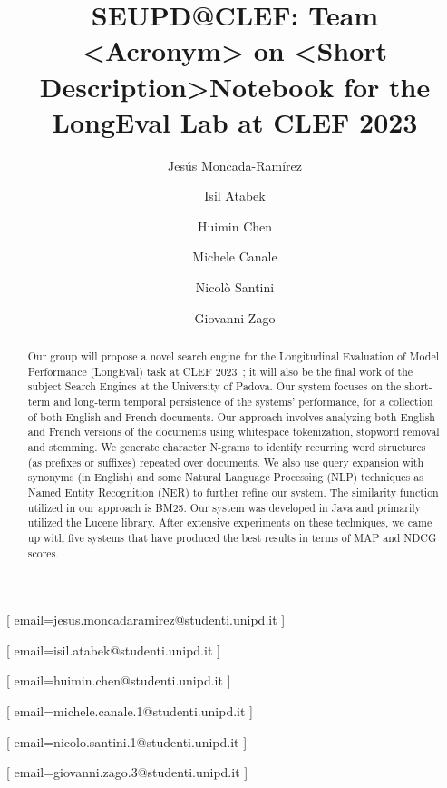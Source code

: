 \documentclass{ceurart}
\begin{document}


\title{SEUPD@CLEF: Team <Acronym> on <Short Description>}

\title[mode=sub]{Notebook for the LongEval Lab at CLEF 2023}

\author[1]{Jes\'us Moncada-Ram\'irez}[%
email=jesus.moncadaramirez@studenti.unipd.it
]

\author[1]{Isil Atabek}[%
email=isil.atabek@studenti.unipd.it
]

\author[1]{Huimin Chen}[%
email=huimin.chen@studenti.unipd.it
]

\author[1]{Michele	Canale}[%
email=michele.canale.1@studenti.unipd.it
]

\author[1]{Nicol\`o Santini}[%
email=nicolo.santini.1@studenti.unipd.it
]

\author[1]{Giovanni Zago}[%
email=giovanni.zago.3@studenti.unipd.it
]


\address[1]{University of Padua, Italy}


\begin{abstract}
  Our group will propose a novel search engine for the Longitudinal Evaluation of Model Performance (LongEval) task at
  CLEF 2023~\cite{LongEval};
  it will also be the final work of the subject Search Engines at the University of Padova.
  Our system focuses on the short-term and long-term temporal persistence of the systems' performance, for a collection
  of both English and French documents.
  Our approach involves analyzing both English and French versions of the documents using whitespace tokenization,
  stopword removal and stemming.
  We generate character N-grams to identify recurring word structures (as prefixes or suffixes) repeated over documents.
  We also use query expansion with synonyms (in English) and some Natural Language Processing (NLP) techniques as Named
  Entity Recognition (NER) to further refine our system.
  The similarity function utilized in our approach is BM25.
  Our system was developed in Java and primarily utilized the Lucene library.
  After extensive experiments on these techniques, we came up with five systems that have produced the best results in
  terms of MAP and NDCG scores.
\end{abstract}
\end{document}
